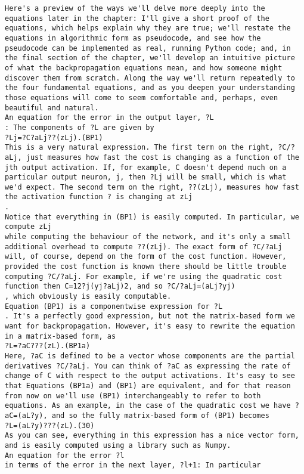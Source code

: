 \begin{lstlisting}
Here's a preview of the ways we'll delve more deeply into the equations later in the chapter: I'll give a short proof of the equations, which helps explain why they are true; we'll restate the equations in algorithmic form as pseudocode, and see how the pseudocode can be implemented as real, running Python code; and, in the final section of the chapter, we'll develop an intuitive picture of what the backpropagation equations mean, and how someone might discover them from scratch. Along the way we'll return repeatedly to the four fundamental equations, and as you deepen your understanding those equations will come to seem comfortable and, perhaps, even beautiful and natural.
An equation for the error in the output layer, ?L
: The components of ?L are given by 
?Lj=?C?aLj??(zLj).(BP1)
This is a very natural expression. The first term on the right, ?C/?aLj, just measures how fast the cost is changing as a function of the jth output activation. If, for example, C doesn't depend much on a particular output neuron, j, then ?Lj will be small, which is what we'd expect. The second term on the right, ??(zLj), measures how fast the activation function ? is changing at zLj
.
Notice that everything in (BP1) is easily computed. In particular, we compute zLj
while computing the behaviour of the network, and it's only a small additional overhead to compute ??(zLj). The exact form of ?C/?aLj will, of course, depend on the form of the cost function. However, provided the cost function is known there should be little trouble computing ?C/?aLj. For example, if we're using the quadratic cost function then C=12?j(yj?aLj)2, and so ?C/?aLj=(aLj?yj)
, which obviously is easily computable.
Equation (BP1) is a componentwise expression for ?L
. It's a perfectly good expression, but not the matrix-based form we want for backpropagation. However, it's easy to rewrite the equation in a matrix-based form, as 
?L=?aC???(zL).(BP1a)
Here, ?aC is defined to be a vector whose components are the partial derivatives ?C/?aLj. You can think of ?aC as expressing the rate of change of C with respect to the output activations. It's easy to see that Equations (BP1a) and (BP1) are equivalent, and for that reason from now on we'll use (BP1) interchangeably to refer to both equations. As an example, in the case of the quadratic cost we have ?aC=(aL?y), and so the fully matrix-based form of (BP1) becomes 
?L=(aL?y)???(zL).(30)
As you can see, everything in this expression has a nice vector form, and is easily computed using a library such as Numpy.
An equation for the error ?l
in terms of the error in the next layer, ?l+1: In particular 

\end{lstlisting}
